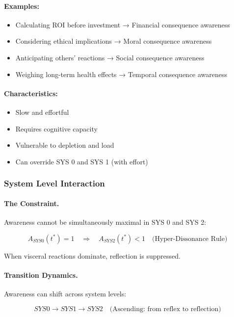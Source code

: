 \paragraph{Examples:}
\begin{itemize}
\item Calculating ROI before investment → Financial consequence awareness
\item Considering ethical implications → Moral consequence awareness
\item Anticipating others' reactions → Social consequence awareness
\item Weighing long-term health effects → Temporal consequence awareness
\end{itemize}

\paragraph{Characteristics:}
\begin{itemize}
\item Slow and effortful
\item Requires cognitive capacity
\item Vulnerable to depletion and load
\item Can override SYS 0 and SYS 1 (with effort)
\end{itemize}

\subsubsection{System Level Interaction}

\paragraph{The Constraint.}
Awareness cannot be simultaneously maximal in SYS 0 and SYS 2:

\begin{equation}
A_{SYS0}(t^*) = 1 \quad \Rightarrow \quad A_{SYS2}(t^*) < 1 \quad \text{(Hyper-Dissonance Rule)}
\end{equation}

When visceral reactions dominate, reflection is suppressed.

\paragraph{Transition Dynamics.}
Awareness can shift across system levels:

\begin{equation}
SYS0 \rightarrow SYS1 \rightarrow SYS2 \quad \text{(Ascending: from reflex to reflection)}
\end{equation}

